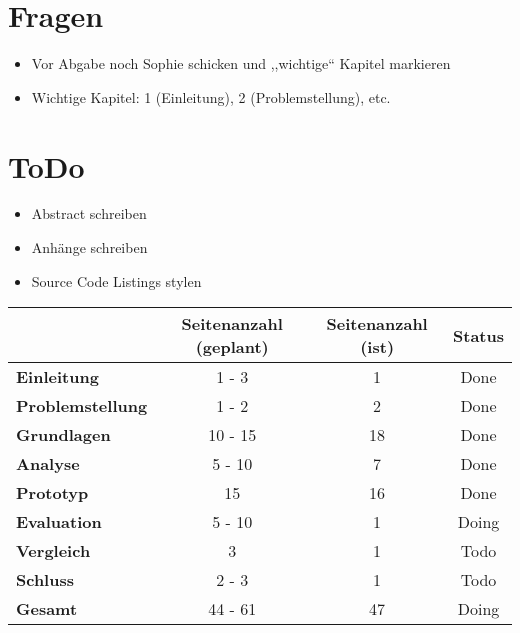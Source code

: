 \section*{Fragen}
    \begin{itemize}
        \item Vor Abgabe noch Sophie schicken und ,,wichtige`` Kapitel markieren
        \item Wichtige Kapitel: 1 (Einleitung), 2 (Problemstellung), etc.
    \end{itemize}
    
\section*{ToDo}
    \begin{itemize}[noitemsep]
        \item Abstract schreiben
        \item Anhänge schreiben
        \item Source Code Listings stylen
    \end{itemize}
    
\begin{table}[H]
\centering
\begin{tabular}{l|c|c|c}
                               & \textbf{Seitenanzahl (geplant)} & \textbf{Seitenanzahl (ist)} & \textbf{Status}        \\ \hline
\textbf{Einleitung}            & 1 - 3                           & {\color{green} 1}          & {\color{green} Done}    \\ \hline
\textbf{Problemstellung}       & 1 - 2                           & {\color{green} 2}           & {\color{green} Done}   \\ \hline
\textbf{Grundlagen}            & 10 - 15                         & {\color{green} 18}         & {\color{green} Done}    \\ \hline
\textbf{Analyse}               & 5 - 10                          & {\color{green} 7}           & {\color{green} Done}   \\ \hline
\textbf{Prototyp}              & 15                              & {\color{green} 16}         & {\color{green} Done}    \\ \hline
\textbf{Evaluation}            & 5 - 10                          & {\color{red} 1}             & {\color{yellow} Doing} \\ \hline
\textbf{Vergleich}             & 3                               & {\color{red} 1}             & {\color{red} Todo}     \\ \hline
\textbf{Schluss}               & 2 - 3                           & {\color{red} 1}             & {\color{red} Todo}     \\ \hline
\textbf{Gesamt}                & 44 - 61                         & {\color{green} 47}         & {\color{yellow} Doing}  \\
\end{tabular}
\end{table}